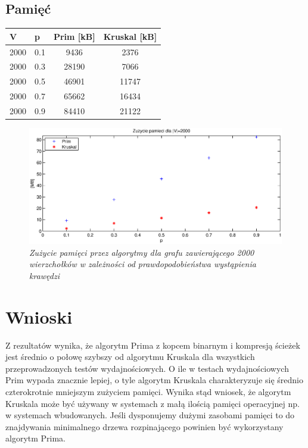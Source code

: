 \documentclass[a4paper, 10pt]{article}
\begin{document}
\FloatBarrier




\subsection{Pamięć}


\begin{center}
    \begin{tabular}{| l | l | c | c |}
    \hline
    V & p & Prim [kB] & Kruskal [kB] \\ \hline
	2000 & 0.1 & 9436 & 2376  \\ 
	2000 & 0.3 & 28190& 7066  \\ 
	2000 & 0.5 & 46901& 11747  \\ 
	2000 & 0.7 & 65662& 16434  \\ 
	2000 & 0.9 & 84410& 21122  \\ \hline
    \end{tabular}
\end{center}




\begin{figure}[ht!]
\centering
\includegraphics[width=165mm]{wykresy/mem.eps}
\caption{\it{Zużycie pamięci przez algorytmy dla grafu zawierającego 2000 wierzchołków w zależności od prawdopodobieństwa wystąpienia krawędzi}}
\label{overflow}
\end{figure}
\FloatBarrier
\section{Wnioski}

Z rezultatów wynika, że algorytm Prima z kopcem binarnym i kompresją ścieżek jest średnio o połowę szybszy od algorytmu Kruskala dla wszystkich przeprowadzonych testów wydajnościowych.
O ile w testach wydajnościowych Prim wypada znacznie lepiej, o tyle algorytm Kruskala charakteryzuje się średnio czterokrotnie mniejszym zużyciem pamięci. Wynika stąd wniosek, że algorytm 
Kruskala może być używany w systemach z małą ilością pamięci operacyjnej np. w systemach wbudowanych. Jeśli dysponujemy dużymi zasobami pamięci to do znajdywania minimalnego drzewa rozpinającego
powinien być wykorzystany algorytm Prima.







	
\FloatBarrier




\nocite{*}
\renewcommand\refname{\section{Bibliografia}}

\end{document}
